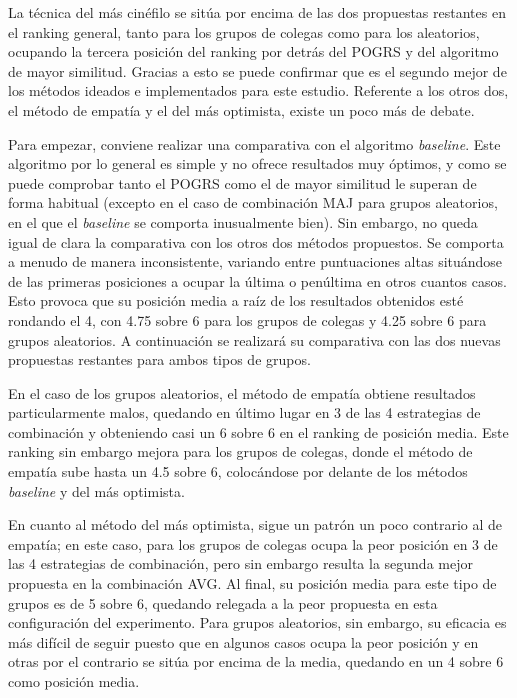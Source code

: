 La técnica del más cinéfilo se sitúa por encima de las dos propuestas restantes en el ranking general, tanto para los grupos de colegas como para los aleatorios, ocupando la tercera posición del ranking por detrás del POGRS y del algoritmo de mayor similitud. Gracias a esto se puede confirmar que es el segundo mejor de los métodos ideados e implementados para este estudio. Referente a los otros dos, el método de empatía y el del más optimista, existe un poco más de debate.

Para empezar, conviene realizar una comparativa con el algoritmo \textit{baseline}. Este algoritmo por lo general es simple y no ofrece resultados muy óptimos, y como se puede comprobar tanto el POGRS como el de mayor similitud le superan de forma habitual (excepto en el caso de combinación MAJ para grupos aleatorios, en el que el \textit{baseline} se comporta inusualmente bien). Sin embargo, no queda igual de clara la comparativa con los otros dos métodos propuestos. Se comporta a menudo de manera inconsistente, variando entre puntuaciones altas situándose de las primeras posiciones a ocupar la última o penúltima en otros cuantos casos. Esto provoca que su posición media a raíz de los resultados obtenidos esté rondando el 4, con 4.75 sobre 6 para los grupos de colegas y 4.25 sobre 6 para grupos aleatorios. A continuación se realizará su comparativa con las dos nuevas propuestas restantes para ambos tipos de grupos.

En el caso de los grupos aleatorios, el método de empatía obtiene resultados particularmente malos, quedando en último lugar en 3 de las 4 estrategias de combinación y obteniendo casi un 6 sobre 6 en el ranking de posición media. Este ranking sin embargo mejora para los grupos de colegas, donde el método de empatía sube hasta un 4.5 sobre 6, colocándose por delante de los métodos \textit{baseline} y del más optimista.

En cuanto al método del más optimista, sigue un patrón un poco contrario al de empatía; en este caso, para los grupos de colegas ocupa la peor posición en 3 de las 4 estrategias de combinación, pero sin embargo resulta la segunda mejor propuesta en la combinación AVG. Al final, su posición media para este tipo de grupos es de 5 sobre 6, quedando relegada a la peor propuesta en esta configuración del experimento. Para grupos aleatorios, sin embargo, su eficacia es más difícil de seguir puesto que en algunos casos ocupa la peor posición y en otras por el contrario se sitúa por encima de la media, quedando en un 4 sobre 6 como posición media.

